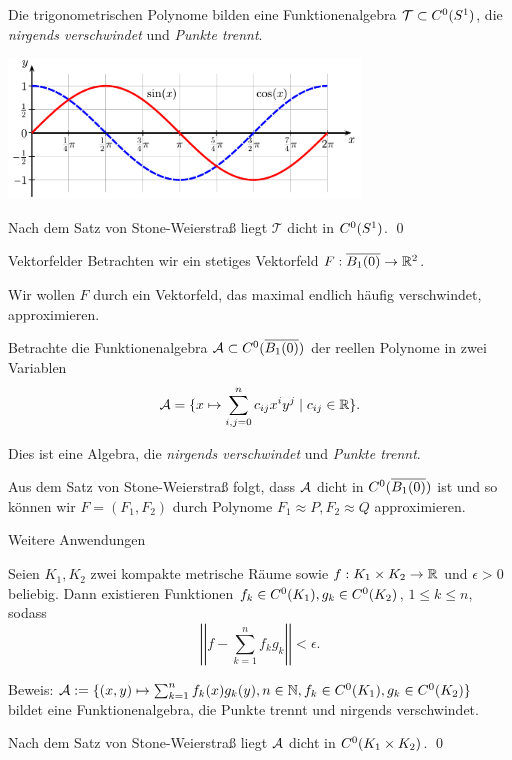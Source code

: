 \begin{frame}
    Die trigonometrischen Polynome bilden eine Funktionenalgebra \( \mathcal{T} \subset C^0(S^1) \), 
    die \textit{nirgends verschwindet} und \textit{Punkte trennt}.
    \pause 

    \begin{center}
        \includegraphics[width=0.7\textwidth]{images/sin-cos.pdf}
    \end{center}
    \pause

    Nach dem Satz von Stone-Weierstraß liegt \( \mathcal{T} \) dicht in \( C^0(S^1) \). \qed
\end{frame}

\newcommand{\B}{\overline{B_1(0)}}

\begin{frame}{Vektorfelder}
    Betrachten wir ein stetiges Vektorfeld 
    \( \abb{F}{\B}{\R^2} \).\pause

    Wir wollen \( F \) durch ein Vektorfeld, das maximal endlich 
    häufig verschwindet, approximieren.
    \pause

    Betrachte die Funktionenalgebra \( \A \subset \C(\B) \) 
    der reellen Polynome in zwei Variablen \pause
    \[ \mathcal{A} = \{ x \mapsto \sum_{i,j=0}^n c_{ij} x^i y^j \;|\; c_{ij} \in \mathbb{R} \}. \]
    \pause

    Dies ist eine Algebra, die \textit{nirgends verschwindet} und \textit{Punkte trennt}.
    \pause

    Aus dem Satz von Stone-Weierstraß folgt, dass \(\mathcal{A}\) dicht in \( \C(\B) \) ist 
    und so können wir \( F = (F_1, F_2) \) durch Polynome 
    \( F_1 \approx P, F_2 \approx Q \) approximieren.
\end{frame}

\begin{frame}{Weitere Anwendungen}
    \begin{kor}
        Seien \(K_1, K_2\) zwei kompakte metrische Räume
        sowie \( f:K_1 \times K_2\rightarrow \mathbb{R} \) und \(\epsilon > 0\) beliebig.
        \pause
        Dann existieren Funktionen 
        \(f_k \in C^0(K_1), g_k \in C^0(K_2)\), 
        \(1 \leq k \leq n\),
        sodass 
        \[ \left|\left| f - \sum_{k=1}^n f_k g_k \right|\right| < \epsilon. \]
    \end{kor}
    \pause
    Beweis: \pause
    \( \mathcal{A} := \{ (x,y) \mapsto \sum_{k=1}^n f_k(x) g_k(y), 
    n\in \mathbb{N}, f_k \in C^0(K_1), g_k \in C^0(K_2)\} \) bildet eine Funktionenalgebra, 
    die Punkte trennt und nirgends verschwindet. 
    \pause

    Nach dem Satz von Stone-Weierstraß liegt 
    \(\mathcal{A}\) dicht in \( C^0(K_1 \times K_2) \).
    \qed
\end{frame}
